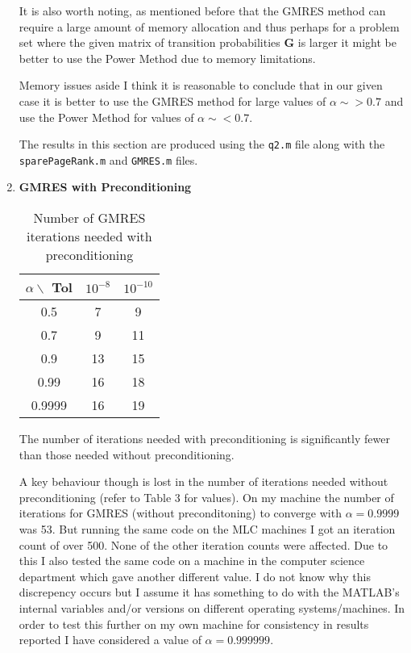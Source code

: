 \documentclass{article}
\begin{document}
\begin{enumerate}
	It is also worth noting, as mentioned before that the GMRES method can require a large amount of memory allocation and thus perhaps for a problem set where the given matrix of transition probabilities $\boldsymbol{G}$ is larger it might be better to use the Power Method due to memory limitations.
	
	Memory issues aside I think it is reasonable to conclude that in our given case it is better to use the GMRES method for large values of $\alpha \sim> 0.7$ and use the Power Method for values of $\alpha \sim< 0.7$.  
	
	The results in this section are produced using the \texttt{q2.m} file along with the \texttt{sparePageRank.m} and \texttt{GMRES.m} files. 
	
	\item \textbf{GMRES with Preconditioning} \\
	
	\begin{table}[h!]
		\centering
		\begin{tabular}{|c|c|c|}
			\hline
			$\alpha \backslash$ Tol & $10^{-8}$ & $10^{-10}$ \\
			\hline
			0.5 & 7 & 9\\
   			0.7 & 9 & 11\\
   			0.9 & 13 & 15\\
  			0.99 & 16 & 18\\
  			0.9999 & 16 & 19\\
  			\hline
		\end{tabular}
	\caption{Number of GMRES iterations needed with preconditioning}
	\end{table}
	
	The number of iterations needed with preconditioning is significantly fewer than those needed without preconditioning. 
	
	A key behaviour though is lost in the number of iterations needed without preconditioning (refer to Table 3 for values). On my machine the number of iterations for GMRES (without preconditoning) to converge with $\alpha = 0.9999$ was 53. But running the same code on the MLC machines I got an iteration count of over 500. None of the other iteration counts were affected. Due to this I also tested the same code on a machine in the computer science department which gave another different value. I do not know why this discrepency occurs but I assume it has something to do with the MATLAB's internal variables and/or versions on different operating systems/machines. In order to test this further on my own machine for consistency in results reported I have considered a value of $\alpha = 0.999999$. 
	

\end{enumerate}
\end{document}
